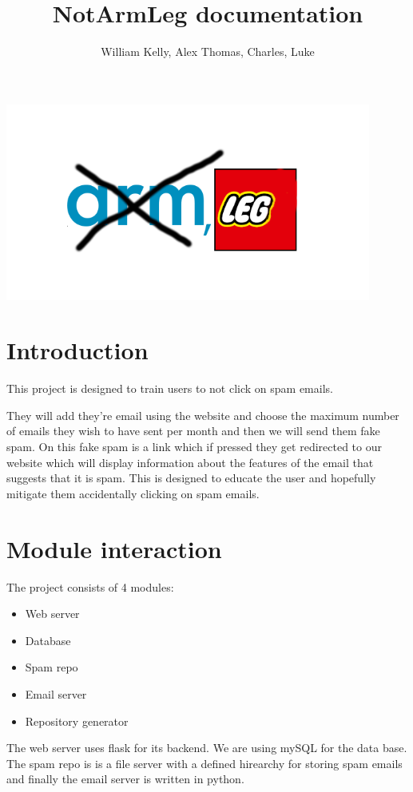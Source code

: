 \documentclass{article}
\begin{document}
\title{NotArmLeg documentation}
\author{William Kelly, Alex Thomas, Charles, Luke} 
\maketitle{}

\begin{center}
    \centering
    \includegraphics[width=0.9\textwidth]{armnotleg}
\end{center}
\newpage

\section{Introduction}
This project is designed to train users to not click on spam emails.

They will add they're email using the website and choose the maximum number of emails they wish to have sent per month and then we will send them fake spam. On this fake spam is a link which if pressed they get redirected to our website which will display information about the features of the email that suggests that it is spam. This is designed to educate the user and hopefully mitigate them accidentally clicking on spam emails.

\section{Module interaction}
The project consists of 4 modules:
\begin{itemize}
    \item Web server
    \item Database
    \item Spam repo
    \item Email server
    \item Repository generator

\end{itemize}
The web server uses flask for its backend. We are using mySQL for the data base. The spam repo is is a file server with a defined hirearchy for storing spam emails and finally the email server is written in python.
\end{document}
